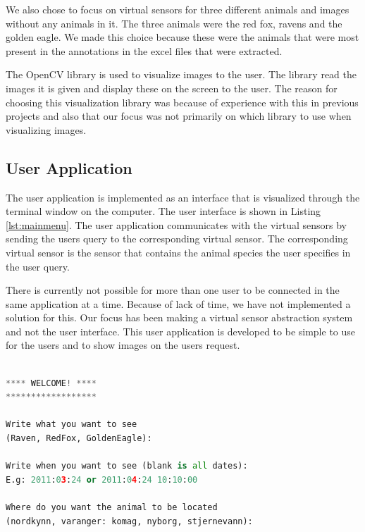 \documentclass[USenglish]{uit-thesis}
\begin{document}
We also chose to focus on virtual sensors for three different animals and images without any animals in it. The three animals were the red fox, ravens and the golden eagle. We made this choice because these were the animals that were most present in the annotations in the excel files that were extracted.



The OpenCV library is used to visualize images to the user. The library read the images it is given and display these on the screen to the user. The reason for choosing this visualization library was because of experience with this in previous projects and also that our focus was not primarily on which library to use when visualizing images.



\subsection{User Application} \label{ssec:user}
The user application is implemented as an interface that is visualized through the terminal window on the computer. The user interface is shown in Listing \ref{lst:mainmenu}. The user application communicates with the virtual sensors by sending the users query to the corresponding virtual sensor. The corresponding virtual sensor is the sensor that contains the animal species the user specifies in the user query.

There is currently not possible for more than one user to be connected in the same application at a time. Because of lack of time, we have not  implemented a solution for this. Our focus has been making a virtual sensor abstraction system and not the user interface. This user application is developed to be simple to use for the users and to show images on the users request.


\begin{lstlisting}[frame=single,caption={Main menu },label={lst:mainmenu}, language=Python]

**** WELCOME! ****
******************

Write what you want to see
(Raven, RedFox, GoldenEagle): 

Write when you want to see (blank is all dates): 
E.g: 2011:03:24 or 2011:04:24 10:10:00

Where do you want the animal to be located
(nordkynn, varanger: komag, nyborg, stjernevann):
\end{lstlisting}
\end{document}
